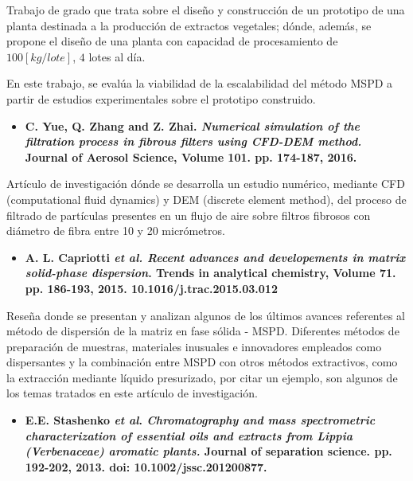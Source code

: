 \noindent
\justify

Trabajo de grado que trata sobre el dise\~no y construcci\'on de un prototipo de una planta destinada a la producci\'on de extractos vegetales; d\'onde, adem\'as, se propone el dise\~no de una planta con capacidad de procesamiento de $100[kg/lote]$, $4$ lotes al d\'ia.

\noindent
\justify

En este trabajo, se eval\'ua la viabilidad de la escalabilidad del m\'etodo MSPD a partir de estudios experimentales sobre el prototipo construido.

\vspace{1cm}

\begin{itemize}
	\item{\textbf{C. Yue, Q. Zhang and Z. Zhai. \textit{Numerical simulation of the filtration process in fibrous filters using CFD-DEM method.} Journal of Aerosol Science, Volume 101. pp. 174-187, 2016.}}
\end{itemize}

\noindent
\justify

Art\'iculo de investigaci\'on d\'onde se desarrolla un estudio num\'erico, mediante CFD (computational fluid dynamics) y DEM (discrete element method), del proceso de filtrado de part\'iculas presentes en un flujo de aire sobre filtros fibrosos con di\'ametro de fibra entre 10 y 20 micr\'ometros. 

\begin{itemize}
	\item{\textbf{A. L. Capriotti \textit{et al. Recent advances and developements in matrix solid-phase dispersion}. Trends in analytical chemistry, Volume 71. pp. 186-193, 2015. 10.1016/j.trac.2015.03.012}}
\end{itemize}

\noindent
\justify

Rese\~na donde se presentan y analizan algunos de los \'ultimos avances referentes al m\'etodo de dispersi\'on de la matriz en fase s\'olida - MSPD. Diferentes m\'etodos de preparaci\'on de muestras, materiales inusuales e innovadores empleados como dispersantes y la combinaci\'on entre MSPD con otros m\'etodos extractivos, como la extracci\'on mediante l\'iquido presurizado, por citar un ejemplo, son algunos de los temas tratados en este art\'iculo de investigaci\'on.

\begin{itemize}
	\item{\textbf{E.E. Stashenko \textit{et al}. \textit{Chromatography and mass spectrometric characterization of essential oils and extracts from Lippia (Verbenaceae) aromatic plants.} Journal of separation science. pp. 192-202, 2013. doi: 10.1002/jssc.201200877.}}
\end{itemize}

